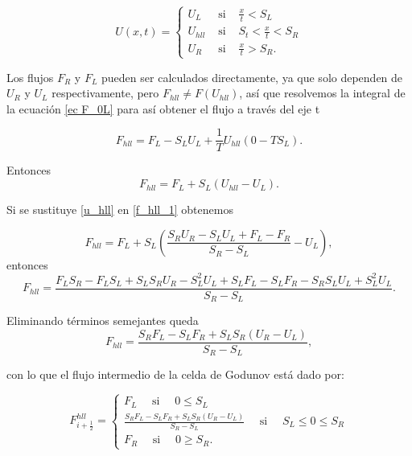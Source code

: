 \documentclass[12pt,a4paper]{book}
\begin{document}
\begin{equation}
  U(x, t)=\left\{\begin{array}{lll}
  U_{L} & \text { si } & \frac{x}{t}<S_{L} \\
  U_{h l l} & \text { si } & S_{t}<\frac{x}{t}<S_{R} \\
  U_{R} & \text { si } & \frac{x}{t}>S_{R}.
  \end{array}\right.
\end{equation}

Los flujos $F_R$ y $F_L$ pueden ser calculados directamente, ya que solo dependen de $U_R$ y $U_L$ respectivamente, pero $F_{hll} \neq F \left( U_{hll} \right)$, así que resolvemos la integral de 
la ecuación \ref{ec F_0L} para así obtener el flujo a través del eje t

\begin{equation*}
F_{hll} = F_L -S_L U_L+ \frac{1}{T}U_{hll}\left(0- TS_L\right).
\end{equation*}

\noindent Entonces
\begin{equation}\label{f_hll_1}
F_{hll} = F_L +S_L \left( U_{hll} -U_L \right).
\end{equation}

\noindent Si se sustituye \ref{u_hll} en \ref{f_hll_1} obtenemos

\begin{equation*}
F_{hll} = F_L +S_L \left( \frac{S_R U_R - S_L U_L + F_L - F_R}{S_R - S_L} -U_L \right),
\end{equation*}
entonces
\begin{equation*}
F_{hll} = \frac{F_L S_R -F_L S_L+S_L S_R U_R-S_L^2 U_L+S_L  F_L- S_L F_R-S_R S_L U_L + S_L^2 U_L}{S_R-S_L}.
\end{equation*}

\noindent Eliminando términos semejantes queda
\begin{equation}
F_{hll} = \frac{S_R F_L -S_L F_R + S_L S_R \left(U_R-U_L \right)}{S_R -S_L},
\end{equation}

\noindent con lo que el flujo intermedio de la celda de Godunov está dado por:


\begin{equation} \label{fluxesHLL}
  F_{i+\frac{1}{2}}^{h l l}=\left\{\begin{array}{l}
  F_{L} \quad \text { si } \quad 0 \leq S_{L} \\
  \frac{S_{R} F_{L}-S_{L} F_{R}+S_{L} S_{R}\left(U_{R}-U_{L}\right)}{S_{R}-S_{L}} \quad \text { si } \quad S_{L}  \leq 0 \leq S_{R} \\
  F_{R} \quad \text { si } \quad 0 \geq S_{R}.
  \end{array}\right.
\end{equation}
\end{document}
